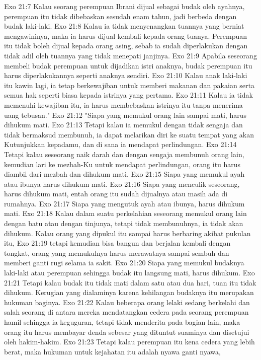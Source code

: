 Exo 21:7  Kalau seorang perempuan Ibrani dijual sebagai budak oleh ayahnya, perempuan itu tidak dibebaskan sesudah enam tahun, jadi berbeda dengan budak laki-laki.
Exo 21:8  Kalau ia tidak menyenangkan tuannya yang berniat mengawininya, maka ia harus dijual kembali kepada orang tuanya. Perempuan itu tidak boleh dijual kepada orang asing, sebab ia sudah diperlakukan dengan tidak adil oleh tuannya yang tidak menepati janjinya.
Exo 21:9  Apabila seseorang membeli budak perempuan untuk dijadikan istri anaknya, budak perempuan itu harus diperlakukannya seperti anaknya sendiri.
Exo 21:10  Kalau anak laki-laki itu kawin lagi, ia tetap berkewajiban untuk memberi makanan dan pakaian serta semua hak seperti biasa kepada istrinya yang pertama.
Exo 21:11  Kalau ia tidak memenuhi kewajiban itu, ia harus membebaskan istrinya itu tanpa menerima uang tebusan."
Exo 21:12  "Siapa yang memukul orang lain sampai mati, harus dihukum mati.
Exo 21:13  Tetapi kalau ia memukul dengan tidak sengaja dan tidak bermaksud membunuh, ia dapat melarikan diri ke suatu tempat yang akan Kutunjukkan kepadamu, dan di sana ia mendapat perlindungan.
Exo 21:14  Tetapi kalau seseorang naik darah dan dengan sengaja membunuh orang lain, kemudian lari ke mezbah-Ku untuk mendapat perlindungan, orang itu harus diambil dari mezbah dan dihukum mati.
Exo 21:15  Siapa yang memukul ayah atau ibunya harus dihukum mati.
Exo 21:16  Siapa yang menculik seseorang, harus dihukum mati, entah orang itu sudah dijualnya atau masih ada di rumahnya.
Exo 21:17  Siapa yang mengutuk ayah atau ibunya, harus dihukum mati.
Exo 21:18  Kalau dalam suatu perkelahian seseorang memukul orang lain dengan batu atau dengan tinjunya, tetapi tidak membunuhnya, ia tidak akan dihukum. Kalau orang yang dipukul itu sampai harus berbaring akibat pukulan itu,
Exo 21:19  tetapi kemudian bisa bangun dan berjalan kembali dengan tongkat, orang yang memukulnya harus merawatnya sampai sembuh dan memberi ganti rugi selama ia sakit.
Exo 21:20  Siapa yang memukul budaknya laki-laki atau perempuan sehingga budak itu langsung mati, harus dihukum.
Exo 21:21  Tetapi kalau budak itu tidak mati dalam satu atau dua hari, tuan itu tidak dihukum. Kerugian yang dialaminya karena kehilangan budaknya itu merupakan hukuman baginya.
Exo 21:22  Kalau beberapa orang lelaki sedang berkelahi dan salah seorang di antara mereka mendatangkan cedera pada seorang perempuan hamil sehingga ia keguguran, tetapi tidak menderita pada bagian lain, maka orang itu harus membayar denda sebesar yang dituntut suaminya dan disetujui oleh hakim-hakim.
Exo 21:23  Tetapi kalau perempuan itu kena cedera yang lebih berat, maka hukuman untuk kejahatan itu adalah nyawa ganti nyawa,
